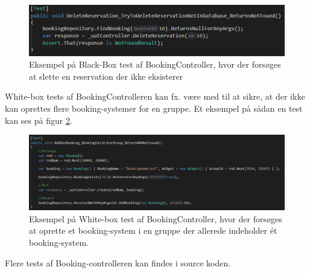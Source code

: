 \begin{figure}[H]
  \includegraphics[width=0.8\linewidth]{01_Billeder/11_Test/Booking_TestDeleteReservation.png}
  \centering
  \caption{Eksempel på Black-Box test af BookingController, hvor der forsøges at slette en reservation der ikke eksisterer}
  \label{fig:Test_BookingDeleteReservation}
\end{figure}

White-box tests af BookingControlleren kan fx. være med til at sikre, at der ikke kan oprettes flere booking-systemer for en gruppe. Et eksempel på sådan en test kan ses på figur \ref{fig:Test_BookingExists}.


\begin{figure}[H]
  \includegraphics[width=\linewidth]{01_Billeder/11_Test/Booking_TestBookingExists.png}
  \centering
  \caption{Eksempel på White-box test af BookingController, hvor der forsøges at oprette et booking-system i en gruppe der allerede indeholder ét booking-system.}
  \label{fig:Test_BookingExists}
\end{figure}

Flere tests af Booking-controlleren kan findes i source koden.

